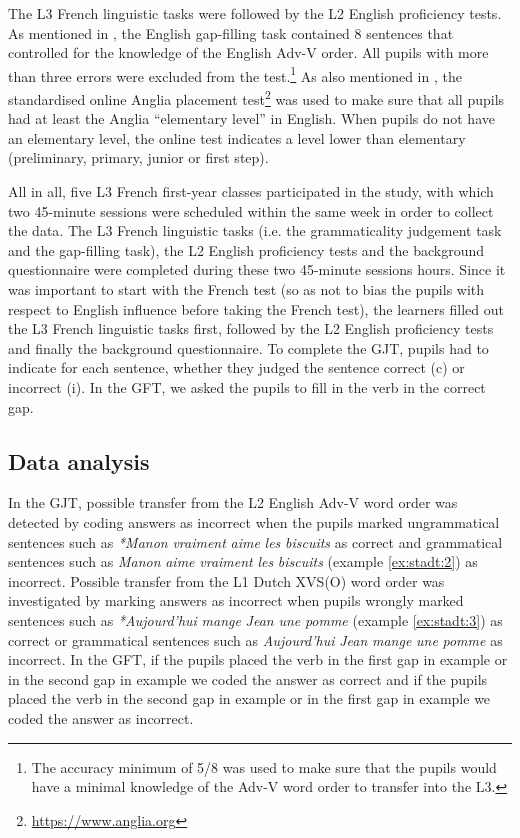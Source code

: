 \documentclass[output=paper]{langsci/langscibook}
\begin{document}
The L3 French linguistic tasks were followed by the L2 English proficiency tests. As mentioned in , the English gap-filling task contained 8 sentences that controlled for the knowledge of the English Adv-V order. All pupils with more than three errors were excluded from the test.\footnote{The accuracy minimum of 5/8 was used to make sure that the pupils would have a minimal knowledge of the Adv-V word order to transfer into the L3.} As also mentioned in , the standardised online Anglia placement test\footnote{\url{https://www.anglia.org}} was used to make sure that all pupils had at least the Anglia ``elementary level'' in English. When pupils do not have an elementary level, the online test indicates a level lower than elementary (preliminary, primary, junior or first step).

All in all, five L3 French first-year classes participated in the study, with which two 45-minute sessions were scheduled within the same week in order to collect the data. The L3 French linguistic tasks (i.e. the grammaticality judgement task and the gap-filling task), the L2 English proficiency tests and the background questionnaire were completed during these two 45-minute sessions hours. Since it was important to start with the French test (so as not to bias the pupils with respect to English influence before taking the French test), the learners filled out the L3 French linguistic tasks first, followed by the L2 English proficiency tests and finally the background questionnaire. To complete the GJT, pupils had to indicate for each sentence, whether they judged the sentence correct (c) or incorrect (i). In the GFT, we asked the pupils to fill in the verb in the correct gap.

\subsection{{Data} {analysis}}
\label{sec:stadt:3.5}

In the GJT, possible transfer from the L2 English Adv-V word order was detected by coding answers as incorrect when the pupils marked ungrammatical sentences such as \textit{*Manon} \textit{vraiment} \textit{aime} \textit{les} \textit{biscuits} as correct and grammatical sentences such as \textit{Manon} \textit{aime} \textit{vraiment} \textit{les} \textit{biscuits} (example \ref{ex:stadt:2}) as incorrect. Possible transfer from the L1 Dutch XVS(O) word order was investigated by marking answers as incorrect when pupils wrongly marked sentences such as \textit{*Aujourd’hui} \textit{mange} \textit{Jean} \textit{une} \textit{pomme} (example \ref{ex:stadt:3}) as correct or grammatical sentences such as \textit{Aujourd’hui} \textit{Jean} \textit{mange} \textit{une} \textit{pomme} as incorrect. In the GFT, if the pupils placed the verb in the first gap in example  or in the second gap in example  we coded the answer as correct and if the pupils placed the verb in the second gap in example  or in the first gap in example  we coded the answer as incorrect.
\end{document}
